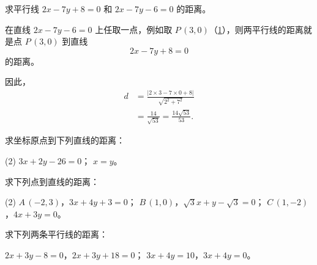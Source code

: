 \begin{example}
  求平行线 $2x-7y+8=0$ 和 $2x-7y-6=0$ 的距离。
\end{example}
\begin{solution}
  在直线 $2x-7y-6=0$ 上任取一点，例如取 $P\,(3,0)$（\cref{fig:1-35}），则两平行线的距离就是点 $P\,(3,0)$ 到直线 
  \[2x-7y+8=0\]
  的距离。

  因此，
  \[\begin{split}
    d&=\frac{|2\times3-7\times0+8|}{\sqrt{2^2+7^2}}\\
    &=\frac{14}{\sqrt{53}}=\frac{14\sqrt{53}}{53}.
  \end{split}\]
\end{solution}
\begin{figure}
  \caption{}\label{fig:1-35}
\end{figure}

\begin{Practice}
  \begin{question}
    \item 求坐标原点到下列直线的距离：
    \begin{tasks}(2)
      \task $3x+2y-26=0$；
      \task $x=y$。
    \end{tasks}
    \item 求下列点到直线的距离：
    \begin{tasks}(2)
      \task $A\,(-2,3)$，$3x+4y+3=0$；
      \task $B\,(1,0)$，$\sqrt{3}x+y-\sqrt{3}=0$；
      \task $C\,(1,-2)$，$4x+3y=0$。
    \end{tasks}
    \item 求下列两条平行线的距离：
    \begin{tasks}
      \task $2x+3y-8=0$，$2x+3y+18=0$；
      \task $3x+4y=10$，$3x+4y=0$。
    \end{tasks}
  \end{question}
\end{Practice}

